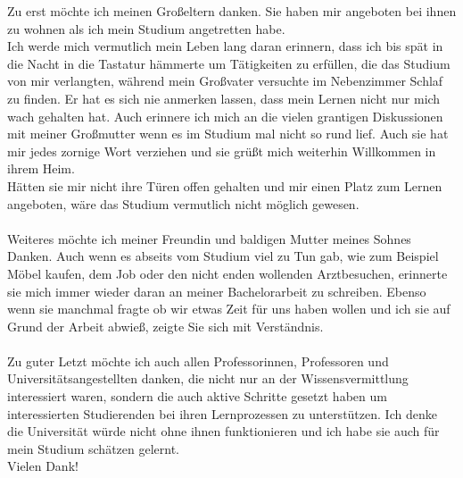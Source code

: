 \documentclass[draft,final]{vutinfth} %
\begin{document}
	


\frontmatter %

\addstatementpage

\begin{danksagung*}
Zu erst möchte ich meinen Großeltern danken. Sie haben mir angeboten bei ihnen zu wohnen als ich mein Studium angetretten habe.\\
Ich werde mich vermutlich mein Leben lang daran erinnern, dass ich bis spät in die Nacht in die Tastatur hämmerte um Tätigkeiten zu erfüllen, die das Studium von mir verlangten, während mein Großvater versuchte im Nebenzimmer Schlaf zu finden. Er hat es sich nie anmerken lassen, dass mein Lernen nicht nur mich wach gehalten hat. Auch erinnere ich mich an die vielen grantigen Diskussionen mit meiner Großmutter wenn es im Studium mal nicht so rund lief. Auch sie hat mir jedes zornige Wort verziehen und sie grüßt mich weiterhin Willkommen in ihrem Heim.\\
Hätten sie mir nicht ihre Türen offen gehalten und mir einen Platz zum Lernen angeboten, wäre das Studium vermutlich nicht möglich gewesen.\\
\\
Weiteres möchte ich meiner Freundin und baldigen Mutter meines Sohnes Danken. Auch wenn es abseits vom Studium viel zu Tun gab, wie zum Beispiel Möbel kaufen, dem Job oder den nicht enden wollenden Arztbesuchen, erinnerte sie mich immer wieder daran an meiner Bachelorarbeit zu schreiben. Ebenso wenn sie manchmal fragte ob wir etwas Zeit für uns haben wollen und ich sie auf Grund der Arbeit abwieß, zeigte Sie sich mit Verständnis.\\
\\
Zu guter Letzt möchte ich auch allen Professorinnen, Professoren und Universitätsangestellten danken, die nicht nur an der Wissensvermittlung interessiert waren, sondern die auch aktive Schritte gesetzt haben um interessierten Studierenden bei ihren Lernprozessen zu unterstützen. Ich denke die Universität würde nicht ohne ihnen funktionieren und ich habe sie auch für mein Studium schätzen gelernt.\\
Vielen Dank!
\end{danksagung*}
\end{document}
